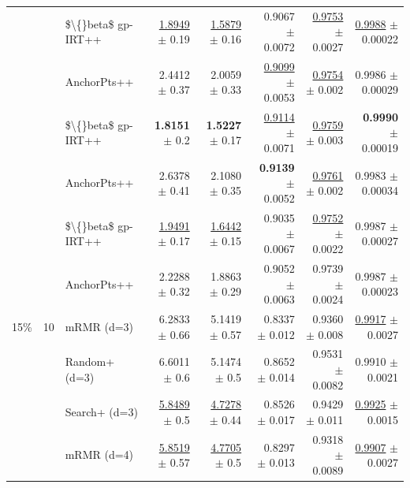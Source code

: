 \begin{longtable}{llp{}rrrrr}
 &  & \$\textbackslash\{\}beta\$ gp-IRT++ & \underline{1.8949} {\scriptsize $\pm$ 0.19} & \underline{1.5879} {\scriptsize $\pm$ 0.16} & 0.9067 {\scriptsize $\pm$ 0.0072} & \underline{0.9753} {\scriptsize $\pm$ 0.0027} & \underline{0.9988} {\scriptsize $\pm$ 0.00022} \\
 &  & AnchorPts++ & 2.4412 {\scriptsize $\pm$ 0.37} & 2.0059 {\scriptsize $\pm$ 0.33} & \underline{0.9099} {\scriptsize $\pm$ 0.0053} & \underline{0.9754} {\scriptsize $\pm$ 0.002} & 0.9986 {\scriptsize $\pm$ 0.00029} \\
 &  & \$\textbackslash\{\}beta\$ gp-IRT++ & \textbf{1.8151} {\scriptsize $\pm$ 0.2} & \textbf{1.5227} {\scriptsize $\pm$ 0.17} & \underline{0.9114} {\scriptsize $\pm$ 0.0071} & \underline{0.9759} {\scriptsize $\pm$ 0.003} & \textbf{0.9990} {\scriptsize $\pm$ 0.00019} \\
 &  & AnchorPts++ & 2.6378 {\scriptsize $\pm$ 0.41} & 2.1080 {\scriptsize $\pm$ 0.35} & \textbf{0.9139} {\scriptsize $\pm$ 0.0052} & \underline{0.9761} {\scriptsize $\pm$ 0.002} & 0.9983 {\scriptsize $\pm$ 0.00034} \\
 &  & \$\textbackslash\{\}beta\$ gp-IRT++ & \underline{1.9491} {\scriptsize $\pm$ 0.17} & \underline{1.6442} {\scriptsize $\pm$ 0.15} & 0.9035 {\scriptsize $\pm$ 0.0067} & \underline{0.9752} {\scriptsize $\pm$ 0.0022} & 0.9987 {\scriptsize $\pm$ 0.00027} \\
 &  & AnchorPts++ & 2.2288 {\scriptsize $\pm$ 0.32} & 1.8863 {\scriptsize $\pm$ 0.29} & 0.9052 {\scriptsize $\pm$ 0.0063} & 0.9739 {\scriptsize $\pm$ 0.0024} & 0.9987 {\scriptsize $\pm$ 0.00023} \\
\midrule
15\% & 10 & mRMR (d=3) & 6.2833 {\scriptsize $\pm$ 0.66} & 5.1419 {\scriptsize $\pm$ 0.57} & 0.8337 {\scriptsize $\pm$ 0.012} & 0.9360 {\scriptsize $\pm$ 0.008} & \underline{0.9917} {\scriptsize $\pm$ 0.0027} \\
 &  & Random+ (d=3) & 6.6011 {\scriptsize $\pm$ 0.6} & 5.1474 {\scriptsize $\pm$ 0.5} & 0.8652 {\scriptsize $\pm$ 0.014} & 0.9531 {\scriptsize $\pm$ 0.0082} & 0.9910 {\scriptsize $\pm$ 0.0021} \\
 &  & Search+ (d=3) & \underline{5.8489} {\scriptsize $\pm$ 0.5} & \underline{4.7278} {\scriptsize $\pm$ 0.44} & 0.8526 {\scriptsize $\pm$ 0.017} & 0.9429 {\scriptsize $\pm$ 0.011} & \underline{0.9925} {\scriptsize $\pm$ 0.0015} \\
 &  & mRMR (d=4) & \underline{5.8519} {\scriptsize $\pm$ 0.57} & \underline{4.7705} {\scriptsize $\pm$ 0.5} & 0.8297 {\scriptsize $\pm$ 0.013} & 0.9318 {\scriptsize $\pm$ 0.0089} & \underline{0.9907} {\scriptsize $\pm$ 0.0027} \\

\end{longtable}
